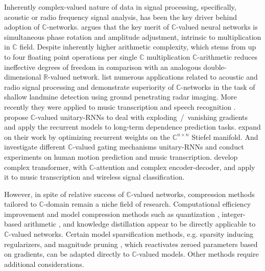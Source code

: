 \documentclass[a4paper,10pt]{article}
\newcommand{\real}{\mathbb{R}}
\newcommand{\cplx}{\mathbb{C}}
\begin{document}
Inherently complex-valued nature of data in signal processing, specifically, acoustic or radio
frequency signal analysis, has been the key driver behind adoption of $\cplx$-networks.
%
\citet{hirose_complex-valued_2009} argues that the key merit of $\cplx$-valued neural
networks is simultaneous phase rotation and amplitude adjustment, intrinsic to multiplication
in $\cplx$ field. Despite inherently higher arithmetic complexity, which stems from up to four
floating point operations per single $\cplx$ multiplication \citep{monning_evaluation_2018}
$\cplx$-arithmetic reduces ineffective degrees of freedom in comparison with an analogous
double-dimensional $\real$-valued network. \citet{hirose_complex-valued_2009} list numerous
applications related to acoustic and radio signal processing and demonstrate superiority of
$\cplx$-networks in the task of shallow landmine detection using ground penetrating radar
imaging. More recently they were applied to music transcription and speech recognition
\citep{trabelsi_deep_2017}. \citet{arjovsky_unitary_2016} propose $\cplx$-valued unitary-RNNs
to deal with exploding~/~vanishing gradients and apply the recurrent models to long-term
dependence prediction tasks. \citet{wisdom_full-capacity_2016} expand on their work by optimizing
recurrent weights on the $\cplx^{n \times n}$ Stiefel manifold. And \citet{wolter_complex_2018}
investigate different $\cplx$-valued gating mechanisms unitary-RNNs and conduct experiments
on human motion prediction and music transcription. \citet{yang_complex_2019} develop complex
transformer, with $\cplx$-attention and complex encoder-decoder, and apply it to music
transcription and wireless signal classification.


However, in spite of relative success of $\cplx$-valued networks, compression methods tailored
to $\cplx$-domain remain a niche field of research.
%
Computational efficiency improvement and model compression methods such as quantization
\citep{uhlich_differentiable_2019}, integer-based arithmetic \citep{lin_fixed_2016,chen_fxpnet_2017},
and knowledge distillation \citep{hinton_distilling_2015} appear to be directly applicable
to $\cplx$-valued networks.
%
Certain model sparsification methods, e.g. sparsity inducing regularizers, and magnitude
pruning \citep{zuo_compression_2019}, which reactivates zeroed parameters based on gradients,
can be adapted directly to $\cplx$-valued models. Other methods require additional considerations.
\end{document}
